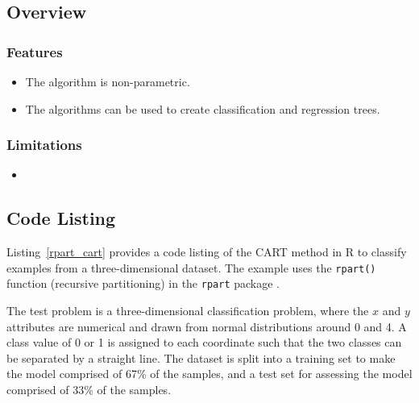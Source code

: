 \subsection{Overview}

\subsubsection{Features}

\begin{itemize}
	\item The algorithm is non-parametric.
	\item The algorithms can be used to create classification and regression trees.
\end{itemize}

\subsubsection{Limitations}

\begin{itemize}
	\item 
\end{itemize}




\subsection{Code Listing}
Listing~\ref{rpart_cart} provides a code listing of the CART method in R to classify examples from a three-dimensional dataset.
The example uses the \texttt{rpart()} function (recursive partitioning) in the \texttt{rpart} package \cite{Meyer2011}.

The test problem is a three-dimensional classification problem, where the $x$ and $y$ attributes are numerical and drawn from normal distributions around 0 and 4. A class value of 0 or 1 is assigned to each coordinate such that the two classes can be separated by a straight line. The dataset is split into a training set to make the model comprised of 67\% of the samples, and a test set for assessing the model comprised of 33\% of the samples.




